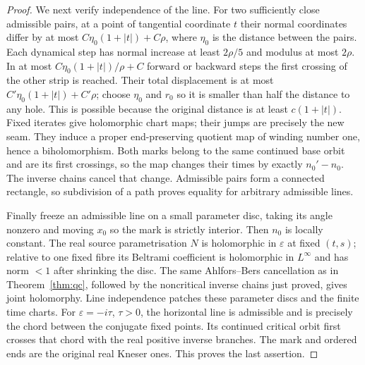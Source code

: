 \documentclass[11pt]{article}
\begin{document}
\begin{proof}
We next verify independence of the line. For two sufficiently close
admissible pairs, at a point of tangential coordinate $t$ their normal
coordinates differ by at most $C\eta_0(1+|t|)+C\rho$, where
$\eta_0$ is the distance between the pairs. Each dynamical step has
normal increase at least $2\rho/5$ and modulus at most $2\rho$.
In at most $C\eta_0(1+|t|)/\rho+C$ forward or backward steps the
first crossing of the other strip is reached. Their total displacement
is at most $C'\eta_0(1+|t|)+C'\rho$; choose $\eta_0$ and $r_0$
so it is smaller than half the distance to any hole. This is possible
because the original distance is at least $c(1+|t|)$.
Fixed iterates give holomorphic chart maps; their jumps are precisely
the new seam. They induce a proper end-preserving quotient map of
winding number one, hence a biholomorphism. Both marks belong to the
same continued base orbit and are its first crossings, so the map
changes their times by exactly $n_0'-n_0$. The inverse chains cancel
that change. Admissible pairs form a connected rectangle, so subdivision
of a path proves equality for arbitrary admissible lines.

Finally freeze an admissible line on a small parameter disc, taking
its angle nonzero and moving $x_0$ so the mark is strictly interior.
Then $n_0$ is locally constant. The real source parametrisation $N$
is holomorphic in $\varepsilon$ at fixed $(t,s)$; relative to one
fixed fibre its Beltrami coefficient is holomorphic in
$L^\infty$ and has norm $<1$ after shrinking the disc. The same
Ahlfors--Bers cancellation as in Theorem~\ref{thm:qc}, followed by
the noncritical inverse chains just proved, gives joint holomorphy.
Line independence patches these parameter discs and the finite time
charts. For $\varepsilon=-i\tau$, $\tau>0$, the horizontal line is
admissible and is precisely the chord between the conjugate fixed
points. Its continued critical orbit first crosses that chord with
the real positive inverse branches. The mark and ordered ends are
the original real Kneser ones. This proves the last assertion.
\end{proof}
\end{document}
